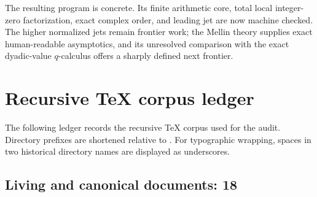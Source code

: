 \documentclass[11pt,oneside]{article}
\numberwithin{equation}{section}
\theoremstyle{plain}
\theoremstyle{definition}
\theoremstyle{remark}
\begin{document}
The resulting program is concrete.  Its finite arithmetic core, total local
integer-zero factorization, exact complex order, and leading jet are now
machine checked.  The higher normalized jets remain frontier work; the
Mellin theory supplies exact human-readable asymptotics, and its unresolved
comparison with the exact dyadic-value $q$-calculus offers a sharply defined
next frontier.

\appendix
\clearpage
\begingroup
\small
\setlength{\tabcolsep}{5pt}
\sloppy
\section{Recursive TeX corpus ledger}\label{app:ledger}

The following ledger records the recursive TeX corpus used for the audit.  Directory prefixes are shortened relative to
.  For typographic wrapping, spaces in two historical directory names are displayed as underscores.

\subsection{Living and canonical documents: 18}
\end{document}
